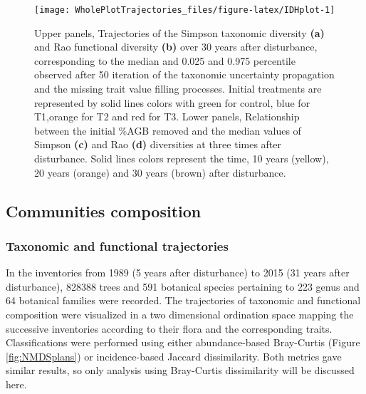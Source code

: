 \documentclass[fleqn,10pt]{ArtEcoFoG} %
\theoremstyle{definition}
\theoremstyle{definition}
\theoremstyle{definition}
\theoremstyle{remark}
\begin{document}
\begin{figure*}

{\centering \texttt{[image: WholePlotTrajectories\_files/figure-latex/IDHplot-1]} 

}

\caption{Upper panels, Trajectories of the Simpson taxonomic diversity \textbf{(a)} and Rao functional diversity \textbf{(b)} over 30 years after disturbance, corresponding to the median and 0.025 and 0.975 percentile observed after 50 iteration of the taxonomic uncertainty propagation and the missing trait value filling processes. Initial treatments are represented by solid lines colors with green for control, blue for T1,orange for T2 and red for T3. Lower panels, Relationship between the initial \%AGB removed and the median values of Simpson \textbf{(c)} and Rao \textbf{(d)} diversities at three times after disturbance. Solid lines colors represent the time, 10 years (yellow), 20 years (orange) and 30 years (brown) after disturbance.}\label{fig:IDHplot}
\end{figure*}

\subsection{Communities composition}\label{communities-composition}

\subsubsection{Taxonomic and functional
trajectories}\label{taxonomic-and-functional-trajectories}

In the inventories from 1989 (5 years after disturbance) to 2015 (31
years after disturbance), 828388 trees and 591 botanical species
pertaining to 223 genus and 64 botanical families were recorded. The
trajectories of taxonomic and functional composition were visualized in
a two dimensional ordination space mapping the successive inventories
according to their flora and the corresponding traits. Classifications
were performed using either abundance-based Bray-Curtis (Figure
\ref{fig:NMDSplans}) or incidence-based Jaccard dissimilarity. Both
metrics gave similar results, so only analysis using Bray-Curtis
dissimilarity will be discussed here.
\end{document}
